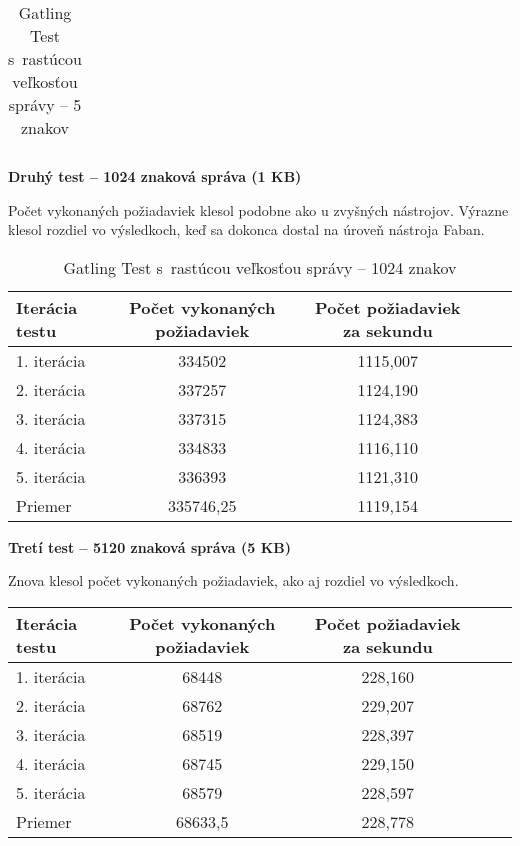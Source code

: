 \documentclass[12pt,oneside,final]{fithesis-utf8}
\begin{document}
\begin{itemize}
\begin{table}[H]
\begin{center}
\begin{tabular}{ | l | c | c | c | c |}
\end{tabular}
\end{center}
\caption{Gatling Test s~rastúcou veľkosťou správy -- 5 znakov}
\end{table}


\textbf{Druhý test -- 1024 znaková správa (1 KB)}

Počet vykonaných požiadaviek klesol podobne ako u zvyšných nástrojov. Výrazne klesol rozdiel vo výsledkoch, keď sa dokonca dostal na úroveň nástroja Faban.

\begin{table}[H]
\begin{center}
\begin{tabular}{ | l | c | c | c | c |}
		\hline
		 \textbf{Iterácia testu} & \textbf{Počet vykonaných požiadaviek} & \textbf{Počet požiadaviek za sekundu} \\ \hline
		 1. iterácia & 334502 & 1115,007 \\ \hline
		 2. iterácia & 337257 & 1124,190 \\ \hline
		 3. iterácia & 337315 & 1124,383 \\ \hline
		 4. iterácia & 334833 & 1116,110 \\ \hline
		 5. iterácia & 336393 & 1121,310 \\ \hline
		 Priemer & 335746,25 & 1119,154 \\ \hline
		 
\end{tabular}
\end{center}
\caption{Gatling Test s~rastúcou veľkosťou správy -- 1024 znakov}
\end{table}


\textbf{Tretí test -- 5120 znaková správa (5 KB)}

Znova klesol počet vykonaných požiadaviek, ako aj rozdiel vo výsledkoch.

\begin{table}[H]
\begin{center}
\begin{tabular}{ | l | c | c | c | c |}
		\hline
		 \textbf{Iterácia testu} & \textbf{Počet vykonaných požiadaviek} & \textbf{Počet požiadaviek za sekundu} \\ \hline
		 1. iterácia & 68448 & 228,160 \\ \hline
		 2. iterácia & 68762 & 229,207 \\ \hline
		 3. iterácia & 68519 & 228,397 \\ \hline
		 4. iterácia & 68745 & 229,150 \\ \hline
		 5. iterácia & 68579 & 228,597 \\ \hline
		 Priemer & 68633,5 & 228,778 \\ \hline
		 

\end{tabular}
\end{center}
\end{table}
\end{itemize}
\end{document}
